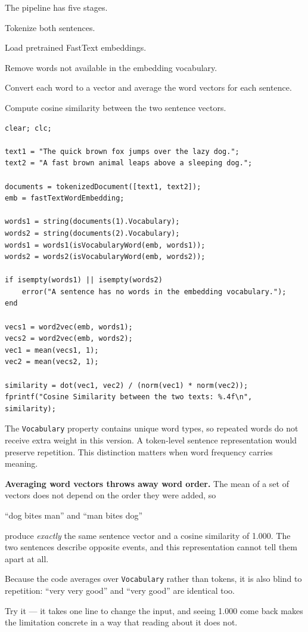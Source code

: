The pipeline has five stages.

\begin{mlsteps}
  \item Tokenize both sentences.
  \item Load pretrained FastText embeddings.
  \item Remove words not available in the embedding vocabulary.
  \item Convert each word to a vector and average the word vectors for each sentence.
  \item Compute cosine similarity between the two sentence vectors.
\end{mlsteps}

\begin{lstlisting}[style=mlmatlab]
clear; clc;

text1 = "The quick brown fox jumps over the lazy dog.";
text2 = "A fast brown animal leaps above a sleeping dog.";

documents = tokenizedDocument([text1, text2]);
emb = fastTextWordEmbedding;

words1 = string(documents(1).Vocabulary);
words2 = string(documents(2).Vocabulary);
words1 = words1(isVocabularyWord(emb, words1));
words2 = words2(isVocabularyWord(emb, words2));

if isempty(words1) || isempty(words2)
    error("A sentence has no words in the embedding vocabulary.");
end

vecs1 = word2vec(emb, words1);
vecs2 = word2vec(emb, words2);
vec1 = mean(vecs1, 1);
vec2 = mean(vecs2, 1);

similarity = dot(vec1, vec2) / (norm(vec1) * norm(vec2));
fprintf("Cosine Similarity between the two texts: %.4f\n", similarity);
\end{lstlisting}

The \texttt{Vocabulary} property contains unique word types, so repeated words do not receive extra weight in this version. A token-level sentence representation would preserve repetition. This distinction matters when word frequency carries meaning.

\begin{pitfall}
\textbf{Averaging word vectors throws away word order.} The mean of a set of vectors does not depend on the order they were added, so

\begin{center}
``dog bites man'' \qquad and \qquad ``man bites dog''
\end{center}

produce \emph{exactly} the same sentence vector and a cosine similarity of 1.000. The two sentences describe opposite events, and this representation cannot tell them apart at all.

Because the code averages over \texttt{Vocabulary} rather than tokens, it is also blind to repetition: ``very very good'' and ``very good'' are identical too.

Try it --- it takes one line to change the input, and seeing 1.000 come back makes the limitation concrete in a way that reading about it does not.
\end{pitfall}

